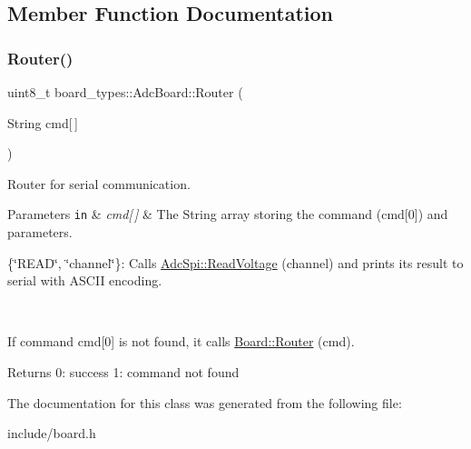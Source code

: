\subsection{Member Function Documentation}
\mbox{\label{classboard__types_1_1AdcBoard_aa695e0499e18263c9bf64331375a37b4}} 
\subsubsection{\texorpdfstring{Router()}{Router()}}
{\footnotesize\ttfamily uint8\+\_\+t board\+\_\+types\+::\+Adc\+Board\+::\+Router (\begin{DoxyParamCaption}\item[{String}]{cmd\mbox{[}$\,$\mbox{]} }\end{DoxyParamCaption})\hspace{0.3cm}{\ttfamily [inline]}}

Router for serial communication. 
\begin{DoxyParams}[1]{Parameters}
\mbox{\tt in}  & {\em cmd\mbox{[}$\,$\mbox{]}} & The String array storing the command (cmd\mbox{[}0\mbox{]}) and parameters.
\begin{DoxyItemize}
\item \{\char`\"{}\+R\+E\+A\+D\char`\"{}, \char`\"{}channel\char`\"{}\}\+: Calls \mbox{\hyperlink{classAdcSpi_ace8264acfedb357986afa5f611eff3ee}{Adc\+Spi\+::\+Read\+Voltage}} (channel) and prints its result to serial with A\+S\+C\+II encoding.
\end{DoxyItemize}\\
\hline
\end{DoxyParams}
If command cmd\mbox{[}0\mbox{]} is not found, it calls \mbox{\hyperlink{classboard__types_1_1Board_acd50f8de221d5b3fd978484efbf5198e}{Board\+::\+Router}} (cmd). \begin{DoxyReturn}{Returns}
0\+: success 1\+: command not found 
\end{DoxyReturn}


The documentation for this class was generated from the following file\+:\begin{DoxyCompactItemize}
\item 
include/board.\+h\end{DoxyCompactItemize}
